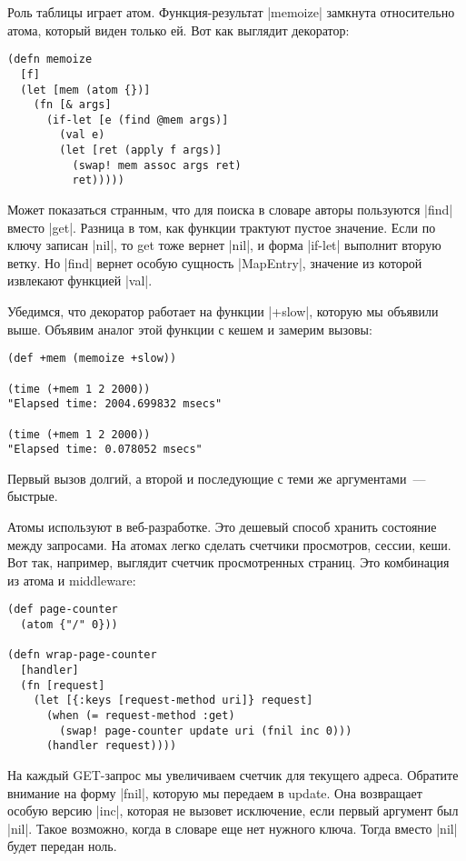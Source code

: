 Роль таблицы играет атом. Функция-результат \spverb|memoize| замкнута относительно
атома, который виден только ей. Вот как выглядит декоратор:

\begin{verbatim}
(defn memoize
  [f]
  (let [mem (atom {})]
    (fn [& args]
      (if-let [e (find @mem args)]
        (val e)
        (let [ret (apply f args)]
          (swap! mem assoc args ret)
          ret)))))
\end{verbatim}

Может показаться странным, что для поиска в словаре авторы пользуются \spverb|find|
вместо \spverb|get|. Разница в том, как функции трактуют пустое значение. Если по ключу
записан \spverb|nil|, то get тоже вернет \spverb|nil|, и форма \spverb|if-let| выполнит вторую
ветку. Но \spverb|find| вернет особую сущность \spverb|MapEntry|, значение из которой
извлекают функцией \spverb|val|.

Убедимся, что декоратор работает на функции \spverb|+slow|, которую мы объявили
выше. Объявим аналог этой функции с кешем и замерим вызовы:

\begin{verbatim}
(def +mem (memoize +slow))

(time (+mem 1 2 2000))
"Elapsed time: 2004.699832 msecs"

(time (+mem 1 2 2000))
"Elapsed time: 0.078052 msecs"
\end{verbatim}

Первый вызов долгий, а второй и последующие с теми же аргументами~--- быстрые.

Атомы используют в веб-разработке. Это дешевый способ хранить состояние между
запросами. На атомах легко сделать счетчики просмотров, сессии, кеши. Вот так,
например, выглядит счетчик просмотренных страниц. Это комбинация из атома и
middleware:

\begin{verbatim}
(def page-counter
  (atom {"/" 0}))

(defn wrap-page-counter
  [handler]
  (fn [request]
    (let [{:keys [request-method uri]} request]
      (when (= request-method :get)
        (swap! page-counter update uri (fnil inc 0)))
      (handler request))))
\end{verbatim}

На каждый GET-запрос мы увеличиваем счетчик для текущего адреса. Обратите
внимание на форму \spverb|fnil|, которую мы передаем в update. Она возвращает особую
версию \spverb|inc|, которая не вызовет исключение, если первый аргумент был
\spverb|nil|. Такое возможно, когда в словаре еще нет нужного ключа. Тогда вместо \spverb|nil|
будет передан ноль.

